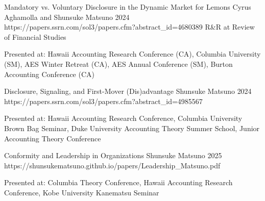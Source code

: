 

\paperentry
	{Mandatory vs. Voluntary Disclosure in the Dynamic Market for Lemons}   %
	{Cyrus Aghamolla and Shunsuke Matsuno}   %
	{2024}   %
	{https://papers.ssrn.com/sol3/papers.cfm?abstract_id=4680389}  %
	{}   %
	{R\&R at Review of Financial Studies}   %
	{
	\begin{cvitems}  %
		\item {Presented at: Hawaii Accounting Research Conference (CA), Columbia University (SM), AES Winter Retreat (CA), AES Annual Conference (SM), Burton Accounting Conference (CA)}			
	\end{cvitems}
	}

\paperentry
	{Disclosure, Signaling, and First-Mover (Dis)advantage}   %
	{Shunsuke Matsuno}   %
	{2024}
	{https://papers.ssrn.com/sol3/papers.cfm?abstract_id=4985567}  %
	{}   %
	{}   %
	{
	\begin{cvitems}  %
		\item {Presented at: Hawaii Accounting Research Conference, Columbia University Brown Bag Seminar, Duke University Accounting Theory Summer School, Junior Accounting Theory Conference}
	\end{cvitems}
	}

\paperentry
	{Conformity and Leadership in Organizations}
	{Shunsuke Matsuno}
	{2025}
	{https://shunsukematsuno.github.io/papers/Leadership_Matsuno.pdf}
	{}
	{}
	{
	\begin{cvitems} %
		\item {Presented at: Columbia Theory Conference, Hawaii Accounting Research Conference, Kobe University Kanematsu Seminar}
	\end{cvitems}
	}

\vspace{.3cm}



